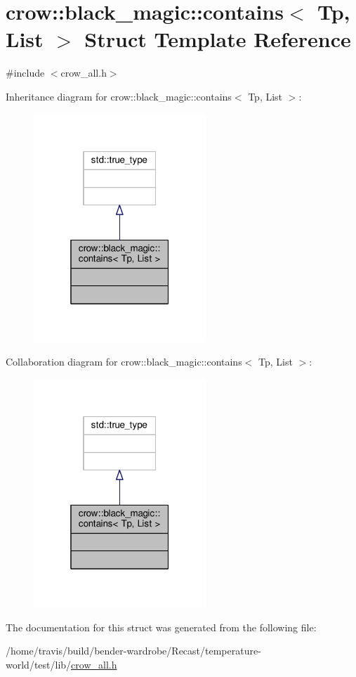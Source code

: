 \hypertarget{structcrow_1_1black__magic_1_1contains}{\section{crow\-:\-:black\-\_\-magic\-:\-:contains$<$ Tp, List $>$ Struct Template Reference}
\label{structcrow_1_1black__magic_1_1contains}
}


{\ttfamily \#include $<$crow\-\_\-all.\-h$>$}



Inheritance diagram for crow\-:\-:black\-\_\-magic\-:\-:contains$<$ Tp, List $>$\-:
\nopagebreak
\begin{figure}[H]
\begin{center}
\leavevmode
\includegraphics[width=184pt]{structcrow_1_1black__magic_1_1contains__inherit__graph}
\end{center}
\end{figure}


Collaboration diagram for crow\-:\-:black\-\_\-magic\-:\-:contains$<$ Tp, List $>$\-:
\nopagebreak
\begin{figure}[H]
\begin{center}
\leavevmode
\includegraphics[width=184pt]{structcrow_1_1black__magic_1_1contains__coll__graph}
\end{center}
\end{figure}


The documentation for this struct was generated from the following file\-:\begin{DoxyCompactItemize}
\item 
/home/travis/build/bender-\/wardrobe/\-Recast/temperature-\/world/test/lib/\hyperlink{crow__all_8h}{crow\-\_\-all.\-h}\end{DoxyCompactItemize}

